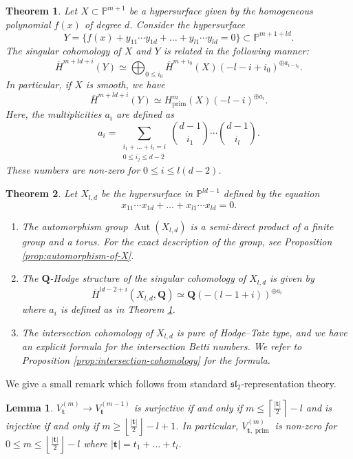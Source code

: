 \documentclass[10pt,a4paper]{amsart}
\newtheorem{theo}{Theorem}
\newtheorem{lemm}{Lemma}
\DeclareMathOperator{\Aut}{Aut}
\newcommand{\PP}{\mathbb{P}}
\newcommand{\QQ}{\mathbf{Q}}
\newcommand{\bft}{\mathbf{t}}
\newcommand{\lround}[1]{\left\lfloor #1 \right\rfloor}
\DeclareMathOperator{\prim}{prim}
\newcommand{\uind}[1]{^{(#1)}}
\newcommand{\uround}[1]{\left\lceil #1 \right\rceil }
\begin{document}
    \begin{theo} \label{theo:appending-snc}
        Let $X \subset \PP^{m+1}$ be a hypersurface given by the homogeneous polynomial $f(x)$ of degree $d$. Consider the hypersurface
        $$ Y = \{ f(x) + y_{11} \cdots y_{1d} + \ldots + y_{l1}\cdots y_{ld} = 0\} \subset \PP^{m+ 1+ld}.$$
        The singular cohomology of $X$ and $Y$ is related in the following manner:
        $$ \overline{H}^{m+ld+ i}(Y) \simeq \bigoplus_{0 \leq i_{0}} \overline{H}^{m + i_{0}}(X) (-l-i+i_{0})^{\oplus a_{i-i_{0}}}.$$
        In particular, if $X$ is smooth, we have
        $$ \overline{H}^{m+ld + i}(Y) \simeq H^{m}_{\prim}(X)(-l-i)^{\oplus a_{i}}.$$
        Here, the multiplicities $a_{i}$ are defined as
        $$ a_{i} = \sum_{\substack{i_{1}+ \ldots + i_{l} = i \\ 0 \leq i_{j} \leq d-2}} {d - 1 \choose i_{1}}\cdots {d - 1 \choose i_{l}}.$$
        These numbers are non-zero for $0 \leq i \leq l(d-2)$.
    \end{theo}

    \begin{theo}\label{theo:main-theorem}
        Let $X_{l,d}$ be the hypersurface in $\PP^{ld-1}$ defined by the equation
        $$ x_{11} \cdots x_{1d} + \ldots + x_{l1}\cdots x_{ld} = 0.$$
        \begin{enumerate}
            \item The automorphism group $\Aut(X_{l,d})$ is a semi-direct product of a finite group and a torus. For the exact description of the group, see Proposition \ref{prop:automorphism-of-X}.
            \item The $\QQ$-Hodge structure of the singular cohomology of $X_{l,d}$ is given by
            $$ \overline{H}^{ld-2+i}(X_{l,d}, \QQ) \simeq \QQ(-(l-1+i))^{\oplus a_{i}}$$
            where $a_{i}$ is defined as in Theorem \ref{theo:appending-snc}.
            \item The intersection cohomology of $X_{l,d}$ is pure of Hodge--Tate type, and we have an explicit formula for the intersection Betti numbers.  We refer to Proposition \ref{prop:intersection-cohomology} for the formula.
        \end{enumerate}
    \end{theo}

     We give a small remark which follows from standard $\mathfrak{sl}_{2}$-representation theory.
     \begin{lemm} \label{lemm:inj-surj-of-V-uind(m)}
         $V_{\bft}\uind{m} \to V_{\bft}\uind{m-1}$ is surjective if and only if $m \leq \uround{\frac{|\bft|}{2}} - l$ and is injective if and only if $m \geq \lround{\frac{|\bft|}{2}} - l + 1$. In particular, $V_{\bft,\prim}\uind{m}$ is non-zero for $0 \leq m \leq \lround{\frac{|\bft|}{2}}-l$ where $|\bft|= t_{1}+ \ldots + t_{l}$.
     \end{lemm}
\end{document}

